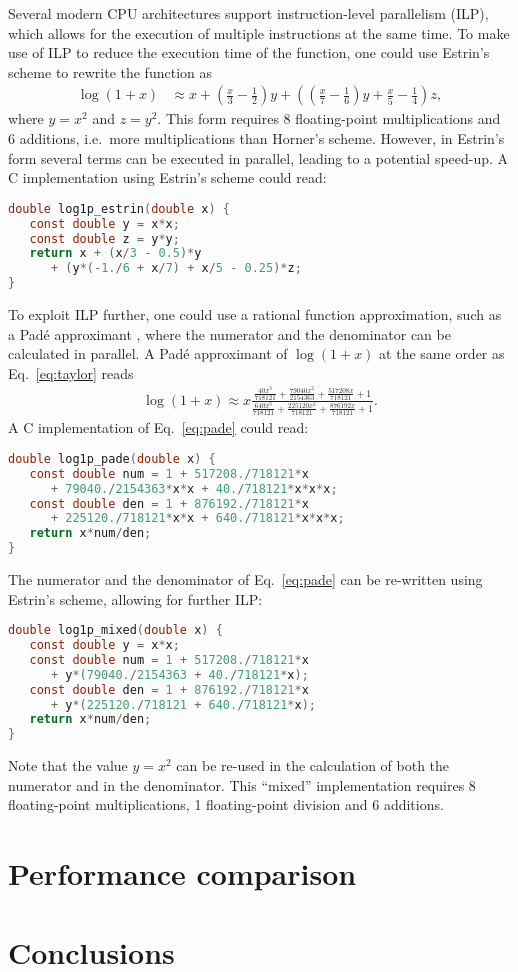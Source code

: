 \documentclass[10pt,DIV16,twocolumn]{scrartcl}
\begin{document}
Several modern CPU architectures support instruction-level parallelism
(ILP), which allows for the execution of multiple instructions at the
same time.  To make use of ILP to reduce the execution time of the
function, one could use Estrin's scheme \cite{estrin} to rewrite the
function as
%
\begin{align}
  \log(1+x) &\approx x + \left(\frac{x}{3}-\frac{1}{2}\right)
    y+\left(\left(\frac{x}{7}-\frac{1}{6}\right)
    y+\frac{x}{5}-\frac{1}{4}\right) z,
  \label{eq:estrin}
\end{align}
%
where $y=x^2$ and $z=y^2$.  This form requires 8 floating-point
multiplications and 6 additions, i.e.\ more multiplications than
Horner's scheme.  However, in Estrin's form several terms can be
executed in parallel, leading to a potential speed-up.  A C
implementation using Estrin's scheme could read:
%
\begin{lstlisting}[language=C]
double log1p_estrin(double x) {
   const double y = x*x;
   const double z = y*y;
   return x + (x/3 - 0.5)*y
      + (y*(-1./6 + x/7) + x/5 - 0.25)*z;
}
\end{lstlisting}

To exploit ILP further, one could use a rational function
approximation, such as a Padé approximant \cite{pade}, where the
numerator and the denominator can be calculated in parallel.  A Padé
approximant of $\log(1+x)$ at the same order as Eq.~\eqref{eq:taylor}
reads
%
\begin{align}
  \log(1+x) \approx x
  \frac{\frac{40 x^3}{718121}+\frac{79040 x^2}{2154363}+\frac{517208
    x}{718121}+1}{\frac{640 x^3}{718121}+\frac{225120 x^2}{718121}+\frac{876192
    x}{718121}+1}.
  \label{eq:pade}
\end{align}
%
A C implementation of Eq.~\eqref{eq:pade} could read:
%
\begin{lstlisting}[language=C]
double log1p_pade(double x) {
   const double num = 1 + 517208./718121*x
      + 79040./2154363*x*x + 40./718121*x*x*x;
   const double den = 1 + 876192./718121*x
      + 225120./718121*x*x + 640./718121*x*x*x;
   return x*num/den;
}
\end{lstlisting}
%
The numerator and the denominator of Eq.~\eqref{eq:pade} can be
re-written using Estrin's scheme, allowing for further ILP:
%
\begin{lstlisting}[language=C]
double log1p_mixed(double x) {
   const double y = x*x;
   const double num = 1 + 517208./718121*x
      + y*(79040./2154363 + 40./718121*x);
   const double den = 1 + 876192./718121*x
      + y*(225120./718121 + 640./718121*x);
   return x*num/den;
}
\end{lstlisting}
%
Note that the value $y=x^2$ can be re-used in the calculation of both
the numerator and in the denominator.  This ``mixed'' implementation
requires 8 floating-point multiplications, 1 floating-point division
and 6 additions.

\section{Performance comparison}

\section{Conclusions}



\end{document}
